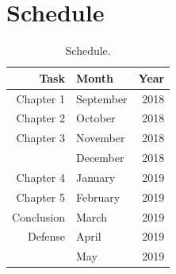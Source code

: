 \documentclass[12pt,twoside,a4paper]{book}
\numberwithin{equation}{section}
\theoremstyle{remark}
\begin{document}
\chapter{Schedule}

\begin{table}[h]
\centering

\begin{tabular}{|r|lr|}
\hline
Task & Month&Year \\ 
\hline                               
Chapter 1& September & 2018 \\
Chapter 2 &October & 2018 \\
Chapter 3&November & 2018 \\
 &December & 2018 \\
Chapter 4&January & 2019 \\
Chapter 5&February & 2019 \\
Conclusion&March & 2019 \\
Defense&April & 2019 \\
 &May & 2019   \\ 
\hline
\end{tabular}
\caption{Schedule.}
\label{tab:schedule}
\end{table}



\end{document}
